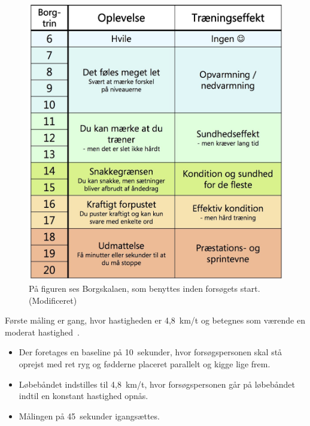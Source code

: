 \begin{figure}[H]
	\centering
	\includegraphics[scale=0.35]{figures/qBilag/Borg-skala.jpg}
	\caption{På figuren ses Borgskalaen, som benyttes inden forsøgets start.~\citep{Patientinformationen2013} (Modificeret)}
	\label{fig:borgskala}
\end{figure}\vspace{-.25cm}

Første måling er gang, hvor hastigheden er 4,8~km/t og betegnes som værende en moderat hastighed~\citep{Miles2007}. %
\begin{itemize}
	\item Der foretages en baseline på 10~sekunder, hvor forsøgspersonen skal stå oprejst med ret ryg og fødderne placeret parallelt og kigge lige frem.
	\item Løbebåndet indstilles til 4,8~km/t, hvor forsøgspersonen går på løbebåndet indtil en konstant hastighed opnås. 
	\item Målingen på 45~sekunder igangsættes.
\end{itemize}

